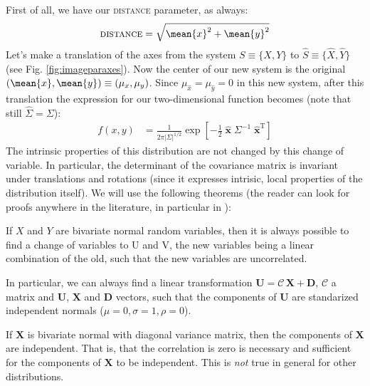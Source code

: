 First of all, we have our {\scshape distance} parameter, as always:
%
\begin{equation}
  \label{eq:distance}
  \text{\scshape distance} = \sqrt{\mean{x}^2 + \mean{y}^2}
\end{equation}
%
Let's make a translation of the axes from the system $S\equiv\{X,Y\}$
to $\hat{S}\equiv\{\hat{X},\hat{Y}\}$ (see Fig.
\ref{fig:imageparaxes}). Now the center of our new system is the
original $(\mean{x}, \mean{y})\equiv(\mu_x, \mu_y)$.  Since
$\mu_{\hat{x}} = \mu_{\hat{y}} = 0 $ in this new system, after this
translation the expression for our two-dimensional function becomes
(note that still $\hat{\Sigma} = \Sigma$):
%
\begin{align}
  \label{eq:gauss2dvechat}
  f(x,y)  &=  \frac{1}{2\pi|\Sigma|^{1/2}} 
  \exp\left[ -\frac{1}{2} \;
    \hat{\mathbf{x}} \; \Sigma^{-1} \; \hat{\mathbf{x}}^{\mathrm{T}}
  \right]
\end{align}
%
The intrinsic properties of this distribution are not changed by this
change of variable. In particular, the determinant of the covariance
matrix is invariant under translations and rotations (since it
expresses intrisic, local properties of the distribution itself). We
will use the following theorems (the reader can look for proofs
anywhere in the literature, in particular in \cite{}):

\begin{Theo}
  If $X$ and $Y$ are bivariate normal random variables, then it is
  always possible to find a change of variables to U and V, the new
  variables being a linear combination of the old, such that the new
  variables are uncorrelated.
\end{Theo}

\begin{Theo}
  In particular, we can always find a linear transformation
  $\mathbf{U}=\mathcal{C}\,\mathbf{X}+\mathbf{D}$, $\mathcal{C}$ a
  matrix and $\mathbf{U}$, $\mathbf{X}$ and $\mathbf{D}$ vectors, such
  that the components of $\mathbf{U}$ are standarized independent
  normals ($\mu=0,\sigma=1,\rho=0$).
\end{Theo}

\begin{Theo}
  If $\mathbf{X}$ is bivariate normal with diagonal variance matrix,
  then the components of $\mathbf{X}$ are independent. That is, that
  the correlation is zero is necessary and sufficient for the
  components of $\mathbf{X}$ to be independent. This is \emph{not}
  true in general for other distributions.
\end{Theo}

